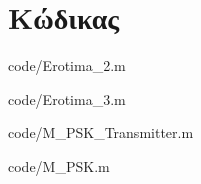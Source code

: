 \documentclass{article}
\begin{document}
\section{Κώδικας}
    
    {code/Erotima_2.m}
    
    
    {code/Erotima_3.m}
    
    
    {code/M_PSK_Transmitter.m}
    
    
    {code/M_PSK.m}
\end{document}

